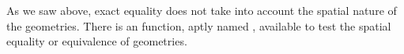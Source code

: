\documentclass[a4paper,11pt,english]{sphinxmanual}
\begin{document}
As we saw above, exact equality does not take into account the spatial nature of the geometries.  There is an function, aptly named , available to test the spatial equality or equivalence of geometries.

\begin{sphinxVerbatim}[commandchars=\\\{\}]
      
        
        
\end{sphinxVerbatim}
\end{document}
